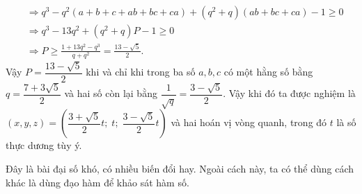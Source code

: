 \begin{bt}
{\begin{align*}
			&\Rightarrow q^3-q^2\left ( a+b+c+ab+bc+ca \right )+\left ( q^2+q \right )\left ( ab+bc+ca \right )-1\geq 0\\
			&\Rightarrow q^3-13q^2+\left ( q^2+q \right )P-1\geq 0\\
			&\Rightarrow P\geq \frac{1+13q^2-q^3}{q+q^2}=\frac{13-\sqrt{5}}{2}.
		\end{align*}
		Vậy $P=\dfrac{13-\sqrt{5}}{2} $ khi và chỉ khi trong ba số $a,b,c$ có một hằng số bằng $q=\dfrac{7+3\sqrt{5}}{2} $ và hai số còn lại bằng $\dfrac{1}{\sqrt{q}}=\dfrac{3-\sqrt{5}}{2} $. Vậy khi đó ta được nghiệm là $\left ( x,y,z \right )=\left (\dfrac{3+\sqrt{5}}{2}t;\;t;\;\dfrac{3-\sqrt{5}}{2}t  \right ) $ và hai hoán vị vòng quanh, trong đó $t$ là số thực dương tùy ý.
		\begin{nx}
			Đây là bài đại số khó, có nhiều biến đổi hay. Ngoài cách này, ta có thể dùng cách khác là dùng đạo hàm để khảo sát hàm số.
		\end{nx}}
\end{bt}

